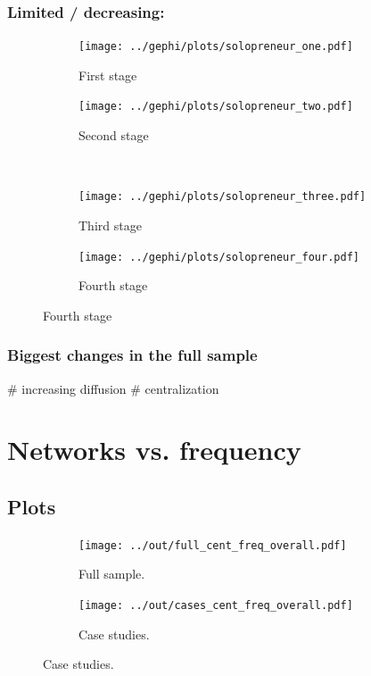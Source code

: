 \documentclass[a4paper]{scrartcl}
\begin{document}
    \subsubsection{Limited / decreasing: }

      \begin{figure}[H]
        \caption{Social network of diffusion for  over time.}
        \centering
        \begin{subfigure}{.45\linewidth}
          \caption{First stage}
          \centering
          \texttt{[image: ../gephi/plots/solopreneur\_one.pdf]}
        \end{subfigure}
        \begin{subfigure}{.45\linewidth}
          \caption{Second stage}
          \centering
          \texttt{[image: ../gephi/plots/solopreneur\_two.pdf]}
        \end{subfigure}\\
        \begin{subfigure}{.45\linewidth}
          \caption{Third stage}
          \centering
          \texttt{[image: ../gephi/plots/solopreneur\_three.pdf]}
        \end{subfigure}
        \begin{subfigure}{.45\linewidth}
          \caption{Fourth stage}
          \centering
          \texttt{[image: ../gephi/plots/solopreneur\_four.pdf]}
        \end{subfigure}
      \end{figure}

    \subsubsection{Biggest changes in the full sample}

      \begin{easylist}[itemize]
        # increasing diffusion
        # centralization
      \end{easylist}

\section{Networks vs. frequency}

  \subsection{Plots}

    \begin{figure}
      \centering
      \begin{subfigure}{.45\linewidth}
        \caption{Full sample.}
        \centering
        \texttt{[image: ../out/full\_cent\_freq\_overall.pdf]}
      \end{subfigure}
      \begin{subfigure}{.45\linewidth}
        \caption{Case studies.}
        \centering
        \texttt{[image: ../out/cases\_cent\_freq\_overall.pdf]}
      \end{subfigure}
    \end{figure}
\end{document}
